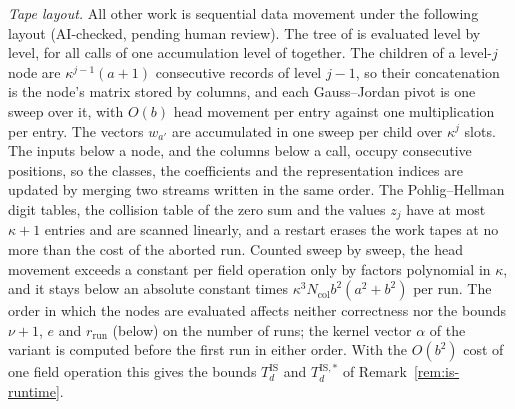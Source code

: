 \begin{remark}
\emph{Tape layout.} All other work is sequential data movement under the following layout (AI-checked, pending human review). The tree of \cite[Lemma~12]{IvanyosSantha2015} is evaluated level by level, for all calls of one accumulation level of \cite[Section~3.3]{IvanyosSantha2015} together. The children of a level-$j$ node are $\kappa^{j-1}(a+1)$ consecutive records of level $j-1$, so their concatenation is the node's matrix stored by columns, and each Gauss--Jordan pivot is one sweep over it, with $O(b)$ head movement per entry against one multiplication per entry. The vectors $w_{a'}$ are accumulated in one sweep per child over $\kappa^j$ slots. The inputs below a node, and the columns below a call, occupy consecutive positions, so the classes, the coefficients and the representation indices are updated by merging two streams written in the same order. The Pohlig--Hellman digit tables, the collision table of the zero sum and the values $z_j$ have at most $\kappa+1$ entries and are scanned linearly, and a restart erases the work tapes at no more than the cost of the aborted run. Counted sweep by sweep, the head movement exceeds a constant per field operation only by factors polynomial in $\kappa$, and it stays below an absolute constant times $\kappa^3N_{\mathrm{col}}b^2(a^2+b^2)$ per run. The order in which the nodes are evaluated affects neither correctness nor the bounds $\nu+1$, $e$ and $r_{\mathrm{run}}$ (below) on the number of runs; the kernel vector $\alpha$ of the variant is computed before the first run in either order. With the $O(b^2)$ cost of one field operation this gives the bounds $T^{\mathrm{IS}}_d$ and $T^{\mathrm{IS},\ast}_d$ of Remark~\ref{rem:is-runtime}.


\end{remark}
